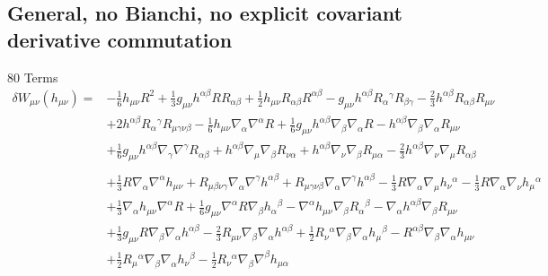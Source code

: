 \documentclass[10pt,letterpaper]{article}
\begin{document}
\subsection*{General, no Bianchi, no explicit covariant derivative commutation}
80 Terms
 \begin{align}
\delta W_{\mu\nu}(h_{\mu\nu})={}&- \tfrac{1}{6} h_{\mu \nu} R^2
 + \tfrac{1}{3} g_{\mu \nu} h^{\alpha \beta} R R_{\alpha \beta}
 + \tfrac{1}{2} h_{\mu \nu} R_{\alpha \beta} R^{\alpha \beta}
 -  g_{\mu \nu} h^{\alpha \beta} R_{\alpha}{}^{\gamma} R_{\beta \gamma}
 -  \tfrac{2}{3} h^{\alpha \beta} R_{\alpha \beta} R_{\mu \nu}\nonumber\\
& + 2 h^{\alpha \beta} R_{\alpha}{}^{\gamma} R_{\mu \gamma \nu \beta}
 -  \tfrac{1}{6} h_{\mu \nu} \nabla_{\alpha}\nabla^{\alpha}R
 + \tfrac{1}{6} g_{\mu \nu} h^{\alpha \beta} \nabla_{\beta}\nabla_{\alpha}R
 -  h^{\alpha \beta} \nabla_{\beta}\nabla_{\alpha}R_{\mu \nu}\nonumber\\
& + \tfrac{1}{6} g_{\mu \nu} h^{\alpha \beta} \nabla_{\gamma}\nabla^{\gamma}R_{\alpha \beta}
 + h^{\alpha \beta} \nabla_{\mu}\nabla_{\beta}R_{\nu \alpha}
 + h^{\alpha \beta} \nabla_{\nu}\nabla_{\beta}R_{\mu \alpha}
 -  \tfrac{2}{3} h^{\alpha \beta} \nabla_{\nu}\nabla_{\mu}R_{\alpha \beta}\nonumber \\
\\
&+\tfrac{1}{3} R \nabla_{\alpha}\nabla^{\alpha}h_{\mu \nu}
 + R_{\mu \beta \nu \gamma} \nabla_{\alpha}\nabla^{\gamma}h^{\alpha \beta}
 + R_{\mu \gamma \nu \beta} \nabla_{\alpha}\nabla^{\gamma}h^{\alpha \beta}
 -  \tfrac{1}{3} R \nabla_{\alpha}\nabla_{\mu}h_{\nu}{}^{\alpha}
 -  \tfrac{1}{3} R \nabla_{\alpha}\nabla_{\nu}h_{\mu}{}^{\alpha}\nonumber\\
& + \tfrac{1}{3} \nabla_{\alpha}h_{\mu \nu} \nabla^{\alpha}R
 + \tfrac{1}{6} g_{\mu \nu} \nabla^{\alpha}R \nabla_{\beta}h_{\alpha}{}^{\beta}
 -  \nabla^{\alpha}h_{\mu \nu} \nabla_{\beta}R_{\alpha}{}^{\beta}
 -  \nabla_{\alpha}h^{\alpha \beta} \nabla_{\beta}R_{\mu \nu}\nonumber\\
& + \tfrac{1}{3} g_{\mu \nu} R \nabla_{\beta}\nabla_{\alpha}h^{\alpha \beta}
 -  \tfrac{2}{3} R_{\mu \nu} \nabla_{\beta}\nabla_{\alpha}h^{\alpha \beta}
 + \tfrac{1}{2} R_{\nu}{}^{\alpha} \nabla_{\beta}\nabla_{\alpha}h_{\mu}{}^{\beta}
 -  R^{\alpha \beta} \nabla_{\beta}\nabla_{\alpha}h_{\mu \nu}\nonumber\\
& + \tfrac{1}{2} R_{\mu}{}^{\alpha} \nabla_{\beta}\nabla_{\alpha}h_{\nu}{}^{\beta}
 -  \tfrac{1}{2} R_{\nu}{}^{\alpha} \nabla_{\beta}\nabla^{\beta}h_{\mu \alpha}

\end{align}
\end{document}
